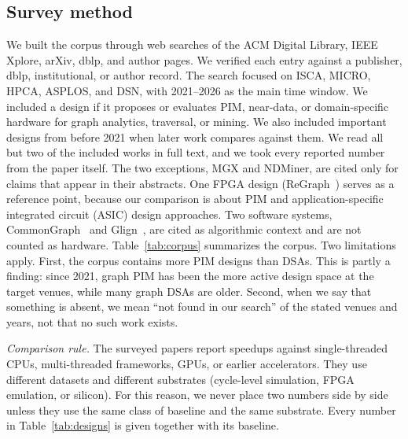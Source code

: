 \documentclass[journal,onecolumn]{IEEEtran}
\begin{document}
\subsection{Survey method}
We built the corpus through web searches of the ACM Digital Library, IEEE Xplore, arXiv, dblp, and author pages. We verified each entry against a publisher, dblp, institutional, or author record. The search focused on ISCA, MICRO, HPCA, ASPLOS, and DSN, with 2021--2026 as the main time window. We included a design if it proposes or evaluates PIM, near-data, or domain-specific hardware for graph analytics, traversal, or mining. We also included important designs from before 2021 when later work compares against them. We read all but two of the included works in full text, and we took every reported number from the paper itself. The two exceptions, MGX and NDMiner, are cited only for claims that appear in their abstracts. One FPGA design (ReGraph~\cite{chen2022regraph}) serves as a reference point, because our comparison is about PIM and application-specific integrated circuit (ASIC) design approaches. Two software systems, CommonGraph~\cite{afarin2023commongraph} and Glign~\cite{yin2023glign}, are cited as algorithmic context and are not counted as hardware. Table~\ref{tab:corpus} summarizes the corpus. Two limitations apply. First, the corpus contains more PIM designs than DSAs. This is partly a finding: since 2021, graph PIM has been the more active design space at the target venues, while many graph DSAs are older. Second, when we say that something is absent, we mean ``not found in our search'' of the stated venues and years, not that no such work exists.

\emph{Comparison rule.} The surveyed papers report speedups against single-threaded CPUs, multi-threaded frameworks, GPUs, or earlier accelerators. They use different datasets and different substrates (cycle-level simulation, FPGA emulation, or silicon). For this reason, we never place two numbers side by side unless they use the same class of baseline and the same substrate. Every number in Table~\ref{tab:designs} is given together with its baseline.
\end{document}
